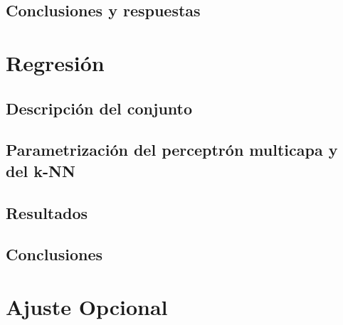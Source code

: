 \documentclass[a4paper, 11pt, twoside, openany, onecolumn, final]{memoir}
\begin{document}
	\section{Conclusiones y respuestas}
	\chapter{Regresión}
		\section{Descripción del conjunto}
	\section{Parametrización del perceptrón multicapa y del k-NN}
	\section{Resultados}
	\section{Conclusiones}
	\chapter{Ajuste Opcional}
\end{document}
